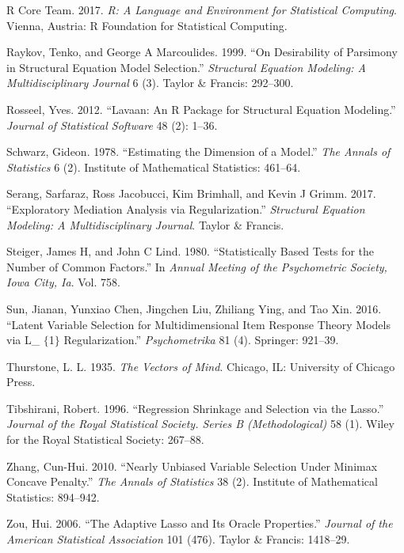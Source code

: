\documentclass[article]{jss}
\begin{document}
\hypertarget{ref-statspackage}{}
R Core Team. 2017. \emph{R: A Language and Environment for Statistical
Computing}. Vienna, Austria: R Foundation for Statistical Computing.

\hypertarget{ref-raykov1999desirability}{}
Raykov, Tenko, and George A Marcoulides. 1999. ``On Desirability of
Parsimony in Structural Equation Model Selection.'' \emph{Structural
Equation Modeling: A Multidisciplinary Journal} 6 (3). Taylor \&
Francis: 292--300.

\hypertarget{ref-rosseel2012}{}
Rosseel, Yves. 2012. ``Lavaan: An R Package for Structural Equation
Modeling.'' \emph{Journal of Statistical Software} 48 (2): 1--36.

\hypertarget{ref-schwarz1978estimating}{}
Schwarz, Gideon. 1978. ``Estimating the Dimension of a Model.''
\emph{The Annals of Statistics} 6 (2). Institute of Mathematical
Statistics: 461--64.

\hypertarget{ref-serang2017xmed}{}
Serang, Sarfaraz, Ross Jacobucci, Kim Brimhall, and Kevin J Grimm. 2017.
``Exploratory Mediation Analysis via Regularization.'' \emph{Structural
Equation Modeling: A Multidisciplinary Journal}. Taylor \& Francis.

\hypertarget{ref-steiger1980}{}
Steiger, James H, and John C Lind. 1980. ``Statistically Based Tests for
the Number of Common Factors.'' In \emph{Annual Meeting of the
Psychometric Society, Iowa City, Ia}. Vol. 758.

\hypertarget{ref-sun2016latent}{}
Sun, Jianan, Yunxiao Chen, Jingchen Liu, Zhiliang Ying, and Tao Xin.
2016. ``Latent Variable Selection for Multidimensional Item Response
Theory Models via L\_ \(\{\)1\(\}\) Regularization.''
\emph{Psychometrika} 81 (4). Springer: 921--39.

\hypertarget{ref-thurstone1937}{}
Thurstone, L. L. 1935. \emph{The Vectors of Mind}. Chicago, IL:
University of Chicago Press.

\hypertarget{ref-Tibshirani1996}{}
Tibshirani, Robert. 1996. ``Regression Shrinkage and Selection via the
Lasso.'' \emph{Journal of the Royal Statistical Society. Series B
(Methodological)} 58 (1). Wiley for the Royal Statistical Society:
267--88.

\hypertarget{ref-zhang2010nearly}{}
Zhang, Cun-Hui. 2010. ``Nearly Unbiased Variable Selection Under Minimax
Concave Penalty.'' \emph{The Annals of Statistics} 38 (2). Institute of
Mathematical Statistics: 894--942.

\hypertarget{ref-zou2006adaptive}{}
Zou, Hui. 2006. ``The Adaptive Lasso and Its Oracle Properties.''
\emph{Journal of the American Statistical Association} 101 (476). Taylor
\& Francis: 1418--29.
\end{document}

